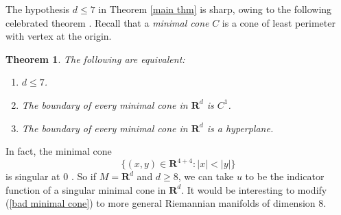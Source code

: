 \documentclass[reqno,12pt,letterpaper]{amsart}
\newcommand{\NN}{\mathbf{N}}
\newcommand{\RR}{\mathbf{R}}
\newcommand{\Hyp}{\mathbf H}
\newcommand{\dfn}[1]{\emph{#1}\index{#1}}
\newtheorem{theorem}{Theorem}[section]
\theoremstyle{definition}
\newtheorem{example}[theorem]{Example}
\numberwithin{equation}{section}
\begin{document}
%

The hypothesis $d \leq 7$ in Theorem \ref{main thm} is sharp, owing to the following celebrated theorem \cite[Theorem 6.2.2]{Simons68} \cite[Theorem A]{BOMBIERI1969}.
Recall that a \dfn{minimal cone} $C$ is a cone of least perimeter with vertex at the origin.

\begin{theorem}\label{minimal cones in R8}
The following are equivalent:
\begin{enumerate}
\item $d \leq 7$.
\item The boundary of every minimal cone in $\RR^d$ is $C^1$.
\item The boundary of every minimal cone in $\RR^d$ is a hyperplane.
\end{enumerate}
\end{theorem}

In fact, the minimal cone
\begin{equation}\label{bad minimal cone}
\{(x, y) \in \RR^{4 + 4}: |x| < |y|\}
\end{equation}
is singular at $0$ \cite[Theorem A]{BOMBIERI1969}.
So if $M = \RR^d$ and $d \geq 8$, we can take $u$ to be the indicator function of a singular minimal cone in $\RR^d$.
It would be interesting to modify (\ref{bad minimal cone}) to more general Riemannian manifolds of dimension $8$.
\end{document}
